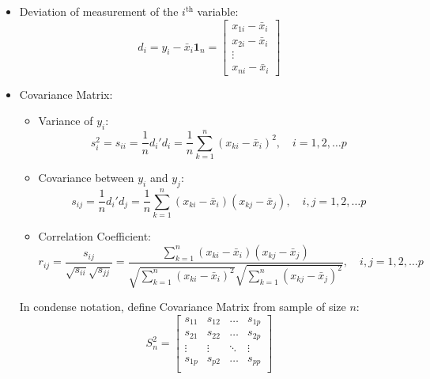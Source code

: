 \begin{itemize}[topsep=6pt,itemsep=4pt]
        \item Deviation of measurement of the $ i^\mathrm{th} $ variable:
        \begin{equation}
            d_i=y_i-\bar{x}_i\mathbf{1}_n=\begin{bmatrix}
                x_{1i}-\bar{x}_i\\x_{2i}-\bar{x}_i\\\vdots\\x_{ni}-\bar{x}_i
            \end{bmatrix} 
        \end{equation}
        \item Covariance Matrix:
            \begin{itemize}[topsep=6pt,itemsep=4pt]      
            \item Variance of $ y_i $:
            \begin{equation}
                s^2_i=s_{ii}=\dfrac{1}{n}d_i'd_i =\dfrac{1}{n}\sum_{k=1}^n (x_{ki}-\bar{x}_i)^2,\quad i=1,2,\ldots p
            \end{equation}
            \item Covariance between $ y_i $ and $ y_j $:
            \begin{equation}
                s_{ij}=\dfrac{1}{n}d_i'd_j=\dfrac{1}{n}\sum_{k=1}^n(x_{ki}-\bar{x}_i)(x_{kj}-\bar{x}_j),\quad i,j=1,2,\ldots p
            \end{equation}
            \item Correlation Coefficient:
            \begin{equation}\label{EqaEstimatorOfCorrelationCoefficient}
                r_{ij}=\dfrac{s_{ij}}{\sqrt{s_{ii}}\sqrt{s_{jj}}}=\dfrac{{\displaystyle\sum_{k=1}^n(x_{ki}-\bar{x}_i)(x_{kj}-\bar{x}_j)}}{\sqrt{{\displaystyle\sum_{k=1}^n(x_{ki}-\bar{x}_i)^2}}\sqrt{{\displaystyle\sum_{k=1}^n(x_{kj}-\bar{x}_j)^2}}},\quad i,j=1,2,\ldots p
            \end{equation}
            \end{itemize}
        
        In condense notation, define Covariance Matrix from sample of size $ n $:
        \begin{equation}
            S^2_n=\begin{bmatrix}
            s_{11}&s_{12}&\ldots&s_{1p}\\
            s_{21}&s_{22}&\ldots&s_{2p}\\
            \vdots&\vdots&\ddots&\vdots\\
            s_{1p}&s_{p2}&\ldots&s_{pp}\\
            \end{bmatrix}
        \end{equation}


\end{itemize}
